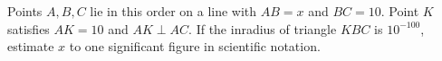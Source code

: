 Points $A,B,C$ lie in this order on a line with $AB=x$ and $BC=10$. Point $K$ satisfies $AK=10$ and $AK\perp AC$. If the inradius of triangle $KBC$ is $10^{-100}$, estimate $x$ to one significant figure in scientific notation.
